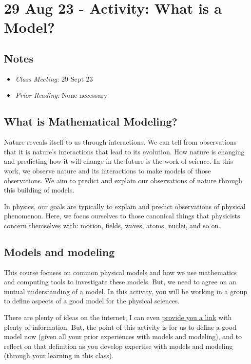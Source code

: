 \section{29 Aug 23 - Activity: What is a
Model?}\label{aug-23---activity-what-is-a-model}

\subsection{Notes}\label{notes}

\begin{itemize}
\tightlist
\item
  \emph{Class Meeting:} 29 Sept 23
\item
  \emph{Prior Reading:} None necessary
\end{itemize}

\subsection{What is Mathematical
Modeling?}\label{what-is-mathematical-modeling}

Nature reveals itself to us through interactions. We can tell from
observations that it is nature's interactions that lead to its
evolution. How nature is changing and predicting how it will change in
the future is the work of science. In this work, we observe nature and
its interactions to make models of those observations. We aim to predict
and explain our observations of nature through this building of models.

In physics, our goals are typically to explain and predict observations
of physical phenomenon. Here, we focus ourselves to those canonical
things that physicists concern themselves with: motion, fields, waves,
atoms, nuclei, and so on.

\subsection{Models and modeling}\label{models-and-modeling}

This course focuses on common physical models and how we use mathematics
and computing tools to investigate these models. But, we need to agree
on an mutual understanding of a model. In this activity, you will be
working in a group to define aspects of a good model for the physical
sciences.

There are plenty of ideas on the internet, I can even
\href{https://bfy.tw/TUdA}{provide you a link} with plenty of
information. But, the point of this activity is for us to define a good
model now (given all your prior experiences with models and modeling),
and to reflect on that definition as you develop expertise with models
and modeling (through your learning in this class).

